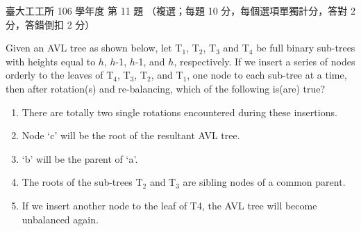 \begin{pastexam}[label={px:ntu-106-ie-ds-11}]{臺大工工所 106 學年度 第 11 題}
（複選；每題 10 分，每個選項單獨計分，答對 2 分，答錯倒扣 2 分）

Given an AVL tree as shown below, let T$_1$, T$_2$, T$_3$ and T$_4$ be full binary sub-trees with
heights equal to $h$, $h$-1, $h$-1, and $h$, respectively. If we insert a series of nodes orderly to the
leaves of T$_4$, T$_3$, T$_2$, and T$_1$, one node to each sub-tree at a time, then after rotation(s) and
re-balancing, which of the following is(are) true?

\begin{center}
\end{center}
\begin{enumerate}[label=(\Alph*),nosep]
\item There are totally two single rotations encountered during these insertions.
\item Node `c' will be the root of the resultant AVL tree.
\item `b' will be the parent of `a'.
\item The roots of the sub-trees T$_2$ and T$_3$ are sibling nodes of a common parent.
\item If we insert another node to the leaf of T4, the AVL tree will become unbalanced again.
\end{enumerate}
\end{pastexam}

